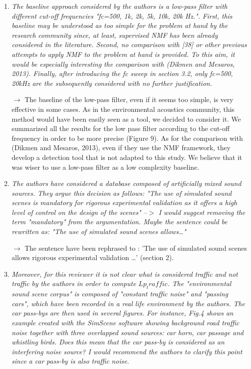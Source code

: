 \documentclass[10pt]{article}
\begin{document}
\begin{enumerate}
\item \emph{The baseline approach considered by the authors is a low-pass filter with different cut-off frequencies "fc={500, 1k, 2k, 5k, 10k, 20k} Hz.". First, this baseline may be understood as too simple for the problem at hand by the research community since, at least, supervised NMF has been already considered in the literature. Second, no comparison with [38] or other previous attempts to apply NMF to the problem at hand is provided. To this aim, it would be especially interesting the comparison with (Dikmen and Mesaros, 2013). Finally, after introducing the fc sweep in section 3.2, only fc={500, 20k}Hz are the subsequently considered with no further justification.}

$\rightarrow$ The baseline of the low-pass filter, even if it seems too simple, is very effective in some cases. As in the environmental acoustics community, this method would have been easily seen as a tool, we decided to consider it. We summarized all the results for the low pass filter according to the cut-off frequency in order to be more precise (Figure 9).
As for the comparison with (Dikmen and Mesaros, 2013), even if they use the NMF framework, they develop a detection tool that is not adapted to this study. We believe that it was wiser to use a low-pass filter as a low complexity baseline.

\item \emph{The authors have considered a database composed of artificially mixed sound sources. They argue this decision as follows: "The use of simulated sound scenes is mandatory for rigorous experimental validation as it offers a high level of control on the design of the scenes" --$>$ I would suggest removing the term "mandatory" from the argumentation. Maybe the sentence could be rewritten as: "The use of simulated sound scenes allows…" }

$\rightarrow$ The sentence have been rephrased to : 'The use of simulated sound scenes allows rigorous experimental validation \dots' (section 2).


\item \emph{Moreover, for this reviewer it is not clear what is considered traffic and not traffic by the authors in order to compute $Lp_traffic$. The "environmental sound scene corpus" is composed of "constant traffic noise" and "passing cars", which have been recorded in a real life environment by the authors. The car pass-bys are then used in several figures. For instance, Fig.4 shows an example created with the SimScene software showing background road traffic noise together with three overlapped sound sources: car horn, car passage and whistling birds. Does this mean that the car pass-by is considered as an interfering noise source? I would recommend the authors to clarify this point since a car pass-by is also traffic noise.}


\end{enumerate}
\end{document}
